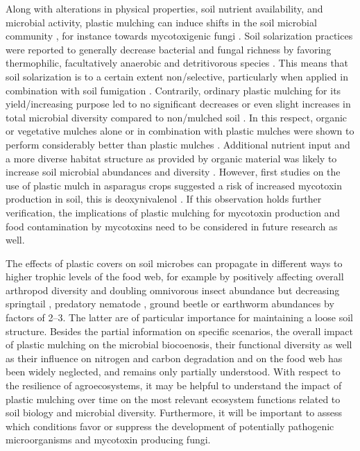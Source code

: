 Along with alterations in physical properties, soil nutrient availability, and microbial activity, plastic mulching can induce shifts in the soil microbial community \citep{HasegawaNitrate2004,MaulMicrobial2014}, for instance towards mycotoxigenic fungi \citep{MunozEffect2015}. Soil solarization practices were reported to generally decrease bacterial and fungal richness by favoring thermophilic, facultatively anaerobic and detritivorous species \citep{BonanomiSoil2008,SimmonsCharacterization2014}. This means that soil solarization is to a certain extent non\-/selective, particularly when applied in combination with soil fumigation \citep[for instance][]{ChellemiFumigant2013}. Contrarily, ordinary plastic mulching for its yield\-/increasing purpose led to no significant decreases \citep{KapanenPerformance2008} or even slight increases in total microbial diversity compared to non\-/mulched soil \citep{ChenMulching2014, LiuRapid2011}. In this respect, organic or vegetative mulches alone or in combination with plastic mulches were shown to perform considerably better than plastic mulches \citep{CarreraEffects2007,MaulMicrobial2014}. Additional nutrient input and a more diverse habitat structure as provided by organic material was likely to increase soil microbial abundances and diversity \citep{DoganEffect2013,MunozEffect2015,SchonbeckEffects1998a}. However, first studies on the use of plastic mulch in asparagus crops suggested a risk of increased mycotoxin production in soil, this is deoxynivalenol \citep{MunozEffect2015}. If this observation holds further verification, the implications of plastic mulching for mycotoxin production and food contamination by mycotoxins need to be considered in future research as well.

The effects of plastic covers on soil microbes can propagate in different ways to higher trophic levels of the food web, for example by positively affecting overall arthropod diversity and doubling omnivorous insect abundance but decreasing springtail \citep{AddisonInitial2013}, predatory nematode \citep{ForgeEffects2003}, ground beetle \citep{MinarroEffects2003} or earthworm abundances \citep{SchonbeckEffects1998a} by factors of \numrange[range-phrase = { to }]{2}{3}. The latter are of particular importance for maintaining a loose soil structure. Besides the partial information on specific scenarios, the overall impact of plastic mulching on the microbial biocoenosis, their functional diversity as well as their influence on nitrogen and carbon degradation and on the food web has been widely neglected, and remains only partially understood. With respect to the resilience of agroecosystems, it may be helpful to understand the impact of plastic mulching over time on the most relevant ecosystem functions related to soil biology and microbial diversity. Furthermore, it will be important to assess which conditions favor or suppress the development of potentially pathogenic microorganisms and mycotoxin producing fungi.

